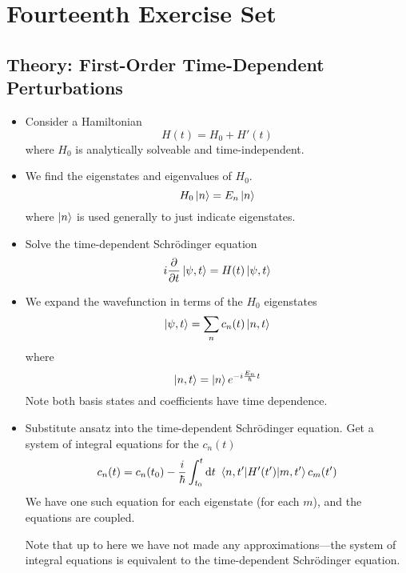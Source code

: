 \documentclass[11pt, a4paper]{article}
\newcommand{\diff}{\mathop{}\!\mathrm{d}} %
\newcommand{\Schro}{Schr\"{o}dinger\xspace}
\newcommand{\Ham}{Hamiltonian\xspace}
\newcommand{\p}{\psi}  %
\begin{document}
\section{Fourteenth Exercise Set}

\subsection{Theory: First-Order Time-Dependent Perturbations}
\begin{itemize}
	\item Consider a \Ham
	\begin{equation*}
		H(t) = H_{0} + H'(t)
	\end{equation*}
	where $ H_{0} $ is analytically solveable and time-independent.
	
	\item We find the eigenstates and eigenvalues of $ H_{0} $. 
	\begin{equation*}
		H_{0}\ket{n} = E_{n}\ket{n}
	\end{equation*}
	where $ \ket{n} $ is used generally to just indicate eigenstates.
	
	\item Solve the time-dependent \Schro equation
	\begin{equation*}
		i \pdv{t} \ket{\p, t} = H(t)\ket{\p, t}
	\end{equation*}
	
	\item We expand the wavefunction in terms of  the $ H_{0} $ eigenstates
	\begin{equation*}
		\ket{\p, t} = \sum_{n}c_{n}(t)\ket{n, t}
	\end{equation*}
	where 
	\begin{equation*}
		\ket{n, t} = \ket{n}e^{-i\frac{E_{n}}{\hbar}t}
	\end{equation*}
	Note both basis states and coefficients have time dependence. 
	
	\item Substitute ansatz into the time-dependent \Schro equation. Get a system of integral equations for the $ c_{n}(t) $
	\begin{equation*}
		c_{n}(t) = c_{n}(t_{0}) - \frac{i}{\hbar}\int_{t_{0}}^{t}\diff t\ \mel{n, t'}{H'(t')}{m, t'}c_{m}(t')
	\end{equation*}
	We have one such equation for each eigenstate (for each $ m $), and the equations are coupled.
	
	Note that up to here we have not made any approximations---the system of integral equations is equivalent to the time-dependent \Schro equation.
	

\end{itemize}
\end{document}
